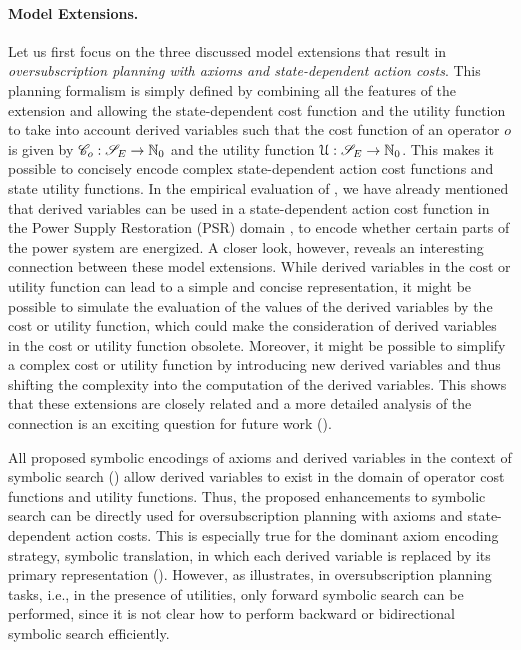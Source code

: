\paragraph{Model Extensions.}
Let us first focus on the three discussed model extensions that result in \emph{oversubscription planning with axioms and state-dependent action costs}.
This planning formalism is simply defined by combining all the features of the extension and allowing the state-dependent cost function and the utility function to take into account derived variables \derivedvars such that the cost function of an operator $o$ is given by $\mathscr C_o : \mathscr S_{E} \to \mathbb{N}_0$ and the utility function $\mathcal U : \mathscr S_{E} \to \mathbb{N}_0$.
This makes it possible to concisely encode complex state-dependent action cost functions and state utility functions.
In the empirical evaluation of , we have already mentioned that derived variables can be used in a state-dependent action cost function in the Power Supply Restoration (PSR) domain \autocite{thiebaux-cordier-ecp2001,thiebaux-et-al-ijcai2013,hoffmann-et-al-jair2006}, to encode whether certain parts of the power system are energized.
A closer look, however, reveals an interesting connection between these model extensions.
While derived variables in the cost or utility function can lead to a simple and concise representation, it might be possible to simulate the evaluation of the values of the derived variables by the cost or utility function, which could make the consideration of derived variables in the cost or utility function obsolete.
Moreover, it might be possible to simplify a complex cost or utility function by introducing new derived variables and thus shifting the complexity into the computation of the derived variables.
This shows that these extensions are closely related and a more detailed analysis of the connection is an exciting question for future work ().

All proposed symbolic encodings of axioms and derived variables in the context of symbolic search () allow derived variables to exist in the domain of operator cost functions and utility functions.
Thus, the proposed enhancements to symbolic search can be directly used for oversubscription planning with axioms and state-dependent action costs.
This is especially true for the dominant axiom encoding strategy, symbolic translation, in which each derived variable is replaced by its primary representation ().
However, as  illustrates, in oversubscription planning tasks, i.e., in the presence of utilities, only forward symbolic search can be performed, since it is not clear how to perform backward or bidirectional symbolic search efficiently.

